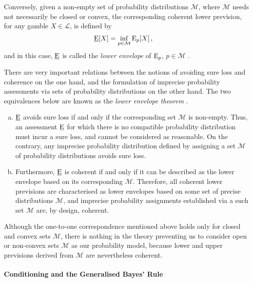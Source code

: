 Conversely, given a non-empty set of probability distributions $\mathcal{M}$,
where $\mathcal{M}$ needs not necessarily be closed or convex,
the corresponding coherent lower prevision, for any gamble $X \in \mathcal{L}$,
is defined by
\begin{align*}
\underline{\operatorname{E}}[X] &= \inf_{p \in \mathcal{M}} \operatorname{E}_p[X]\,,
\end{align*}
and in this case, $\underline{\operatorname{E}}$ is called the \emph{lower envelope} of $\operatorname{E}_p$, $p \in \mathcal{M}$
\parencite[p.~132]{1991:walley}.

There are very important relations between the notions of avoiding sure loss and coherence on the one hand,
and the formulation of imprecise probability assessments via sets of probability distributions on the other hand.
The two equivalences below are known as the \emph{lower envelope theorem} \parencite[\S 3.3.3]{1991:walley}.
\begin{enumerate}[(a)]
\item $\underline{\operatorname{E}}$ avoids sure loss if and only if the corresponding set $\mathcal{M}$ is non-empty.
Thus, an assessment $\underline{\operatorname{E}}$ for which there is no compatible probability distribution
must incur a sure loss, and cannot be considered as reasonable.
On the contrary, any imprecise probability distribution defined by assigning
a set $\mathcal{M}$ of probability distributions avoids sure loss.
\item Furthermore, $\underline{\operatorname{E}}$ is coherent if and only if it can be
described as the lower envelope based on its corresponding $\mathcal{M}$.
Therefore, all coherent lower previsions are characterised as
lower envelopes based on some set of precise distributions $\mathcal{M}$,
and imprecise probability assignments established via a such set $\mathcal{M}$
are, by design, coherent.
\end{enumerate}

Although the one-to-one correspondence mentioned above holds only for closed and convex sets $\mathcal{M}$,
there is nothing in the theory preventing us to consider
open or non-convex sets $\mathcal{M}$ as our probability model, %
because lower and upper previsions derived from $\mathcal{M}$ are nevertheless coherent.

%
%

\paragraph{Conditioning and the Generalised Bayes' Rule}

